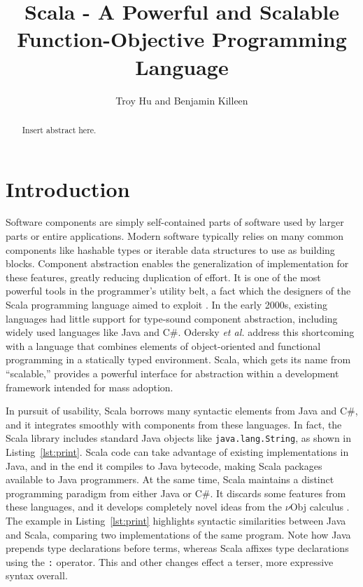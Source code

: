 \documentclass[jou,apacite]{IEEEtran}
\title{Scala - A Powerful and Scalable Function-Objective Programming Language}
\author{Troy Hu and Benjamin Killeen} %
\begin{document}
\maketitle    

\begin{abstract}
Insert abstract here.
\end{abstract}                     

\section{Introduction}
\label{sec:intro}

Software components are simply self-contained parts of software used by larger
parts or entire applications. Modern software typically relies on many common
components like hashable types or iterable data structures to use as building
blocks. Component abstraction enables the generalization of implementation for
these features, greatly reducing duplication of effort. It is one of the most
powerful tools in the programmer's utility belt, a fact which the designers of
the Scala programming language aimed to exploit \cite{odersky2004overview}. In
the early 2000s, existing languages had little support for type-sound component
abstraction, including widely used languages like Java and C\#. Odersky \emph{et
  al.} address this shortcoming with a language that combines elements of
object-oriented and functional programming in a statically typed
environment. Scala, which gets its name from ``scalable,'' provides a powerful
interface for abstraction within a development framework intended for mass
adoption.

In pursuit of usability, Scala borrows many syntactic elements from Java and
C\#, and it integrates smoothly with components from these languages. In fact,
the Scala library includes standard Java objects like \texttt{java.lang.String},
as shown in Listing~\ref{lst:print}. Scala code can take advantage of existing
implementations in Java, and in the end it compiles to Java bytecode, making
Scala packages available to Java programmers. At the same time, Scala maintains
a distinct programming paradigm from either Java or C\#. It discards some
features from these languages, and it develops completely novel ideas from the
$\nu$Obj calculus \cite{odersky_nominal_2003}. The example in
Listing~\ref{lst:print} highlights syntactic similarities between Java and Scala,
comparing two implementations of the same program. Note how Java prepends type
declarations before terms, whereas Scala affixes type declarations using the
\texttt{:} operator. This and other changes effect a terser, more expressive
syntax overall.
\end{document}
